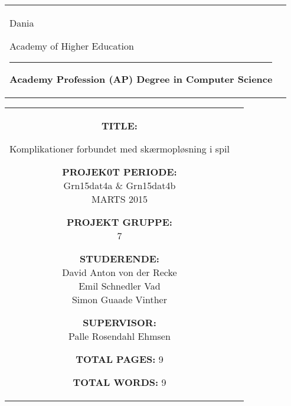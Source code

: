 



	
\thispagestyle{empty}
\begin{titlepage}
\begin{nopagebreak}
{\samepage 
\begin{tabular}{lr}
\parbox{14.5cm}{
  {\LARGE Dania}

  {\small Academy of Higher Education}
  \vspace{-0.3cm}\\
\hrule
\vspace{0.2cm}
  {\bf Academy Profession (AP) Degree in Computer Science}
 }   & \hspace{-2.8cm} { }
\end{tabular}
  

\begin{tabular}{cc}
\parbox{8cm}{
\hspace{2cm}
\begin{description}

\item {\bf TITLE:} 

  Komplikationer forbundet med skærmopløsning i spil

\end{description}

\parbox{8cm}{

\begin{description}
\item {\bf PROJEK0T PERIODE:}\\
  Grn15dat4a \& Grn15dat4b \\
  MARTS 2015\\
  \hspace{4cm}
\item {\bf PROJEKT GRUPPE:}\\
  7\\
  \hspace{4cm}
\item {\bf STUDERENDE:}\\
  David Anton von der Recke\\
  Emil Schnedler Vad\\
  Simon Guaade Vinther\\  
  \hspace{2cm}
\item {\bf SUPERVISOR:}\\
  Palle Rosendahl Ehmsen\\
\end{description}
}
\begin{description}
\item{ {\bf TOTAL PAGES:} 9 }
\item{ {\bf TOTAL WORDS:} 9 }
\end{description}
} &
\parbox{7cm}{
  \vspace{.15cm}
  \flushright
     }
\end{tabular}
}
\end{nopagebreak}
\end{titlepage}

